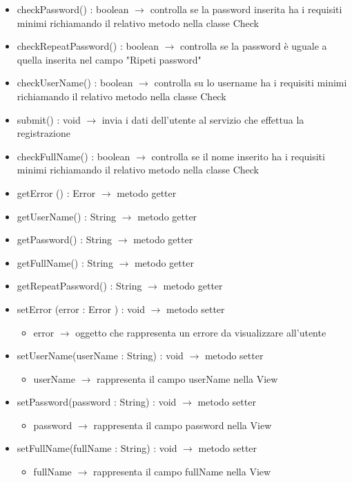 \begin{description}
\begin{itemize}
	\item checkPassword() : boolean $\rightarrow$ controlla se la password inserita ha i requisiti minimi richiamando il relativo metodo nella classe Check
	\item checkRepeatPassword() : boolean $\rightarrow$ controlla se la password è uguale a quella inserita nel campo "Ripeti password"
	\item checkUserName() : boolean $\rightarrow$ controlla su lo username ha i requisiti minimi richiamando il relativo metodo nella classe Check
	\item submit() : void $\rightarrow$ invia i dati dell'utente al servizio che effettua la registrazione
	\item checkFullName() : boolean $\rightarrow$ controlla se il nome inserito ha i requisiti minimi richiamando il relativo metodo nella classe Check
	\item getError	() : Error	 $\rightarrow$ metodo getter
	\item getUserName() : String $\rightarrow$ metodo getter
	\item getPassword() : String $\rightarrow$ metodo getter
	\item getFullName() : String $\rightarrow$ metodo getter
	\item getRepeatPassword() : String $\rightarrow$ metodo getter
	\item setError	(error	 : Error	) : void $\rightarrow$ metodo setter\begin{itemize}
		\item error	 $\rightarrow$ oggetto che rappresenta un errore da visualizzare all'utente
	\end{itemize}
	
	\item setUserName(userName : String) : void $\rightarrow$ metodo setter\begin{itemize}
		\item userName $\rightarrow$ rappresenta il campo userName nella View
	\end{itemize}
	
	\item setPassword(password : String) : void $\rightarrow$ metodo setter\begin{itemize}
		\item password $\rightarrow$ rappresenta il campo password nella View
	\end{itemize}
	
	\item setFullName(fullName : String) : void $\rightarrow$ metodo setter\begin{itemize}
		\item fullName $\rightarrow$ rappresenta il campo fullName nella View
	\end{itemize}
	

\end{itemize}
\end{description}
